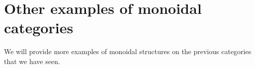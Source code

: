 \section{Other examples of monoidal categories}
\begin{publictodo}
    We will provide more examples of monoidal structures 
    on the previous categories that we have seen.
\end{publictodo}

\section{}
\label{sec:premonoidal}
\publictodomessage


\devel{
    
}

